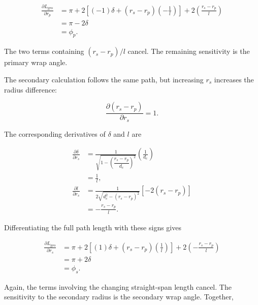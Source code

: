 \documentclass[11pt]{report}
\numberwithin{equation}{section}
\begin{document}
\begin{align}
    \frac{\partial L_{\mathrm{geo}}}{\partial r_p}
    &=
    \pi
    +
    2\left[
        (-1)\delta
        +
        (r_s-r_p)\left(-\frac{1}{l}\right)
    \right]
    +
    2\left(\frac{r_s-r_p}{l}\right)
    \nonumber\\
    &=
    \pi-2\delta
    \nonumber\\
    &=
    \phi_p.
    \label{eq:belt_length_primary_sensitivity}
\end{align}

The two terms containing \((r_s-r_p)/l\) cancel. The remaining sensitivity is
the primary wrap angle.

The secondary calculation follows the same path, but increasing \(r_s\)
increases the radius difference:

\begin{equation}
    \frac{\partial(r_s-r_p)}{\partial r_s}=1.
    \label{eq:radius_difference_secondary_derivative}
\end{equation}

The corresponding derivatives of \(\delta\) and \(l\) are

\begin{align}
    \frac{\partial\delta}{\partial r_s}
    &=
    \frac{1}
    {\sqrt{1-\left(\dfrac{r_s-r_p}{d_c}\right)^2}}
    \left(\frac{1}{d_c}\right)
    \nonumber\\
    &=
    \frac{1}{l},
    \label{eq:span_angle_secondary_derivative}\\[8pt]
    \frac{\partial l}{\partial r_s}
    &=
    \frac{1}
    {2\sqrt{d_c^2-(r_s-r_p)^2}}
    \left[-2(r_s-r_p)\right]
    \nonumber\\
    &=
    -\frac{r_s-r_p}{l}.
    \label{eq:straight_span_secondary_derivative}
\end{align}

Differentiating the full path length with these signs gives

\begin{align}
    \frac{\partial L_{\mathrm{geo}}}{\partial r_s}
    &=
    \pi
    +
    2\left[
        (1)\delta
        +
        (r_s-r_p)\left(\frac{1}{l}\right)
    \right]
    +
    2\left(-\frac{r_s-r_p}{l}\right)
    \nonumber\\
    &=
    \pi+2\delta
    \nonumber\\
    &=
    \phi_s.
    \label{eq:belt_length_secondary_sensitivity}
\end{align}

Again, the terms involving the changing straight-span length cancel. The
sensitivity to the secondary radius is the secondary wrap angle. Together,
\end{document}
